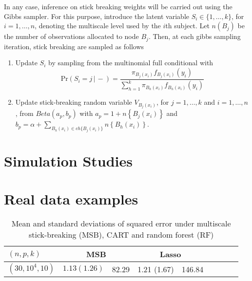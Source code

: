 \documentclass{article}
\begin{document}
In any case, inference on stick breaking weights will be carried out using the Gibbs sampler. For this purpose, introduce the latent variable $S_i \in \{1,\ldots,k\}$, for $i=1,\ldots,n$, denoting the multiscale level used by the $i$th subject. Let $n(B_j)$ be the number of observations allocated to node $B_j$. Then, at each gibbs sampling iteration, stick breaking are sampled as follows 
\begin{enumerate}
\item Update $S_i$ by sampling from the multinomial full conditional with 
\[\mbox{Pr}( S_i = j\, |\, -) = \frac{ \pi_{B_j(x_i)}f_{B_j(x_i)}(y_i) }{ \sum_{h=1}^k \pi_{B_h(x_i)}f_{B_h(x_i)}(y_i) } \label{eq:prS}\]
\item Update stick-breaking random variable $V_{B_j(x_i)}$, for $j=1, \ldots, k$ and $i=1, \ldots, n$, from $Beta(a_p,b_p)$ with $a_p=1+n\left\{B_j(x_i)\right\}$ and $b_p=\alpha+\sum_{B_h(x_i) \in ch\{B_j(x_i)\}} n\left\{B_h(x_i)\right\}$.
\end{enumerate}

\section{Simulation Studies}
\section{Real data examples}


\newpage
\nocite{langley00}





\begin{table}[t]
\caption{Mean and standard deviations of squared error under multiscale stick-breaking (MSB), CART and random forest (RF)}
\label{table1} \vskip 0.15in \begin{center} \begin{small} \begin{sc}
\begin{tabular}{lllllllll}
\hline
\abovespace\belowspace
 $(n,p,k)$ &\multicolumn{2}{|c|}{MSB}&\multicolumn{2}{|c|}{Lasso}\\
\hline
$(30,10^4,10)$&$1.13 (1.26)$&82.29&1.21 (1.67) &146.84\\%


\hline
\end{tabular}
\end{sc}
\end{small}
\end{center}
\vskip -0.1in
\end{table}
\end{document}
